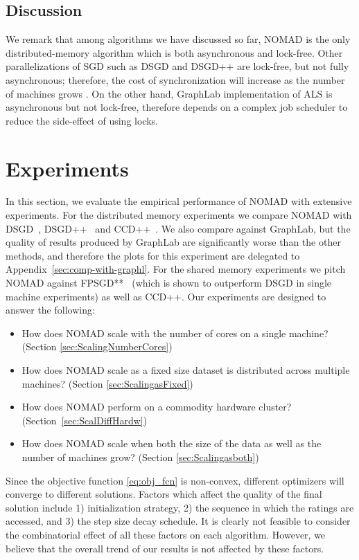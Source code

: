 \documentclass{vldb}
\begin{document}
\subsection{Discussion}

We remark that among algorithms we have discussed so far, NOMAD is the
only distributed-memory algorithm which is both asynchronous and
lock-free.  Other parallelizations of SGD such as DSGD and DSGD++ are
lock-free, but not fully asynchronous; therefore, the cost of
synchronization will increase as the number of machines grows
\citep{ZhuChiJuaLin13}.  On the other hand, GraphLab implementation of
ALS \citep{LowGonKyrBicetal12} is asynchronous but not lock-free,
therefore depends on a complex job scheduler to reduce the side-effect
of using locks.


\section{Experiments}
\label{sec:Experiments}

In this section, we evaluate the empirical performance of NOMAD with
extensive experiments.  For the distributed memory experiments we
compare NOMAD with DSGD~\citep{GemNijHaaSis11},
DSGD++~\citep{TefMakGem12} and CCD++~\citep{YuHsiSiDhi12}.  We also
compare against GraphLab, but the quality of results produced by
GraphLab are significantly worse than the other methods, and therefore
the plots for this experiment are delegated to
Appendix~\ref{sec:comp-with-graphl}. For the shared memory experiments
we pitch NOMAD against FPSGD**~\citep{ZhuChiJuaLin13} (which is shown to
outperform DSGD in single machine experiments) as well as CCD++. Our
experiments are designed to answer the following:
\begin{itemize}
\item How does NOMAD scale with the number of cores on a single machine?
  (Section \ref{sec:ScalingNumberCores})
\item How does NOMAD scale as a fixed size dataset is distributed across
  multiple machines? (Section \ref{sec:ScalingasFixed})
\item How does NOMAD perform on a commodity hardware cluster?
  (Section~\ref{sec:ScalDiffHardw})
\item How does NOMAD scale when both the size of the data as well
  as the number of machines grow? (Section
  \ref{sec:Scalingasboth})
\end{itemize}

Since the objective function \eqref{eq:obj_fcn} is non-convex, different
optimizers will converge to different solutions.  Factors which affect
the quality of the final solution include 1) initialization strategy, 2)
the sequence in which the ratings are accessed, and 3) the step size
decay schedule.  It is clearly not feasible to consider the
combinatorial effect of all these factors on each algorithm.  However,
we believe that the overall trend of our results is not affected by
these factors. 
\end{document}
